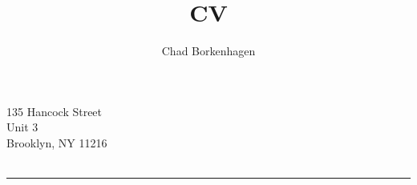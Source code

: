 \documentclass[12pt, letterpaper]{article}
\title{CV}
\author{Chad Borkenhagen}
\begin{document}
\addFooter{\@author\space \@title}{\monthyeardate\today}

\addHeader{\@author}
{
  135 Hancock Street\\
  Unit 3 \\ 
  Brooklyn, NY 11216 \\
   \\ 
}
\rule{\textwidth}{1pt}













\end{document}
